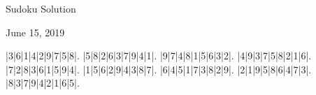 \documentclass{article}
\begin{document}
\begin{center}
\Huge{Sudoku Solution}
\end{center}
\begin{center}
\Large{June 15, 2019}
\end{center}
\begin{sudoku}
|3|6|1|4|2|9|7|5|8|.
|5|8|2|6|3|7|9|4|1|.
|9|7|4|8|1|5|6|3|2|.
|4|9|3|7|5|8|2|1|6|.
|7|2|8|3|6|1|5|9|4|.
|1|5|6|2|9|4|3|8|7|.
|6|4|5|1|7|3|8|2|9|.
|2|1|9|5|8|6|4|7|3|.
|8|3|7|9|4|2|1|6|5|.
\end{sudoku}
\end{document}
